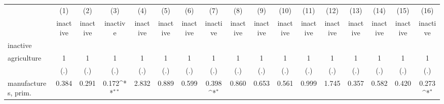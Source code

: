 {
\def\sym#1{\ifmmode^{#1}\else\(^{#1}\)\fi}
\begin{tabular}{l*{16}{c}}
\hline\hline
                    &\multicolumn{1}{c}{(1)}&\multicolumn{1}{c}{(2)}&\multicolumn{1}{c}{(3)}&\multicolumn{1}{c}{(4)}&\multicolumn{1}{c}{(5)}&\multicolumn{1}{c}{(6)}&\multicolumn{1}{c}{(7)}&\multicolumn{1}{c}{(8)}&\multicolumn{1}{c}{(9)}&\multicolumn{1}{c}{(10)}&\multicolumn{1}{c}{(11)}&\multicolumn{1}{c}{(12)}&\multicolumn{1}{c}{(13)}&\multicolumn{1}{c}{(14)}&\multicolumn{1}{c}{(15)}&\multicolumn{1}{c}{(16)}\\
                    &\multicolumn{1}{c}{inactive}&\multicolumn{1}{c}{inactive}&\multicolumn{1}{c}{inactive}&\multicolumn{1}{c}{inactive}&\multicolumn{1}{c}{inactive}&\multicolumn{1}{c}{inactive}&\multicolumn{1}{c}{inactive}&\multicolumn{1}{c}{inactive}&\multicolumn{1}{c}{inactive}&\multicolumn{1}{c}{inactive}&\multicolumn{1}{c}{inactive}&\multicolumn{1}{c}{inactive}&\multicolumn{1}{c}{inactive}&\multicolumn{1}{c}{inactive}&\multicolumn{1}{c}{inactive}&\multicolumn{1}{c}{inactive}\\
\hline
inactive            &                     &                     &                     &                     &                     &                     &                     &                     &                     &                     &                     &                     &                     &                     &                     &                     \\
agriculture         &           1         &           1         &           1         &           1         &           1         &           1         &           1         &           1         &           1         &           1         &           1         &           1         &           1         &           1         &           1         &           1         \\
                    &         (.)         &         (.)         &         (.)         &         (.)         &         (.)         &         (.)         &         (.)         &         (.)         &         (.)         &         (.)         &         (.)         &         (.)         &         (.)         &         (.)         &         (.)         &         (.)         \\
[1em]
manufactures, prim. &       0.384         &       0.291         &       0.172\sym{**} &       2.832         &       0.889         &       0.599         &       0.398\sym{*}  &       0.860         &       0.653         &       0.561         &       0.999         &       1.745         &       0.357         &       0.582         &       0.420         &       0.273\sym{*}  \\

\end{tabular}}
